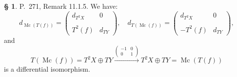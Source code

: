 \documentclass[12pt]{article}%
\theoremstyle{remark}
\theoremstyle{definition}
\newtheorem{s}[thm]{\S}%
\newcommand{\xr}{\xrightarrow}
\DeclareMathOperator{\Mc}{Mc}
\begin{document}
%

\begin{s}
P.~271, Remark 11.1.5. We have:
$$
d_{\Mc(T(f))}=
\begin{pmatrix}
d_{T^2X}&0\\ \\ 
T^2(f)&d_{TY}
\end{pmatrix},\quad 
d_{T(\Mc(f))}=
\begin{pmatrix}
d_{T^2X}&0\\ \\ 
-T^2(f)&d_{TY}
\end{pmatrix},
$$ 
and 
$$
T(\Mc(f))=T^2X\oplus TY\xr{\begin{pmatrix}-1&0\\ 0&1\end{pmatrix}}T^2X\oplus TY=\Mc(T(f))
$$ 
is a differential isomorphism.
\end{s}

%
\end{document}
